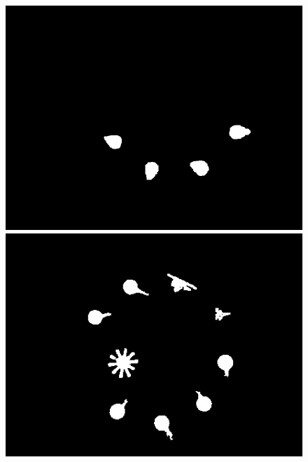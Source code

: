 \documentclass[a4paper]{ctexart}
\begin{document}
\begin{enumerate}[label=\arabic*、]
\begin{figure}[htbp]
		\begin{minipage}[t]{0.25\textwidth}
			\centering
			\includegraphics[width=\textwidth]{figure/add/img3.jpg}
		\end{minipage}
		\begin{minipage}[t]{0.25\textwidth}
			\centering
			\includegraphics[width=\textwidth]{figure/add/img4.jpg}
		\end{minipage}
		\begin{minipage}[t]{0.25\textwidth}
			\centering

\end{minipage}
\end{figure}
\end{enumerate}
\end{document}
